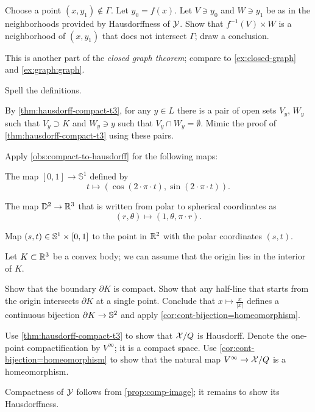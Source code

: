 Choose a point $(x,y_1)\notin \Gamma$.
Let $y_0=f(x)$.
Let $V\ni y_0$ and $W\ni y_1$ be as in the neighborhoods provided by Hausdorffness of $\mathcal{Y}$.
Show that $f^{-1}(V)\times W$ is a neighborhood of $(x,y_1)$ that does not intersect $\Gamma$; draw a conclusion.

 This is another part of the \emph{closed graph theorem}; compare to \ref{ex:closed-graph} and \ref{ex:graph:graph}.

 Spell the definitions.

By \ref{thm:hausdorff-compact-t3}, for any $y\in L$ there is a pair of open sets $V_y$, $W_y$ such that $V_y\supset K$ and $W_y\ni y$ such that $V_y\cap W_y=\emptyset$.
Mimic the proof of \ref{thm:hausdorff-compact-t3} using these pairs.

 Apply \ref{obs:compact-to-hausdorff} for the following maps:

The map $[0,1]\to \mathbb{S}^1$ defined by
\[t\mapsto (\cos (2\cdot\pi\cdot t), \sin(2\cdot\pi\cdot t)).\]

The map $\mathbb{D}^2\to \mathbb{R}^3$ that is written from polar to spherical coordinates as
\[(r,\theta)\mapsto (1, \theta, \pi\cdot r).\]

Map $(s,t)\in\mathbb{S}^1\times [0,1]$ to the point in $\mathbb{R}^2$ with the polar coordinates $(s,t)$.

Let $K\subset\mathbb{R}^3$ be a convex body; we can assume that the origin lies in the interior of $K$.

Show that the boundary $\partial K$ is compact.
Show that any half-line that starts from the origin intersects $\partial K$ at a single point.
Conclude that $x\mapsto \tfrac{x}{|x|}$ defines a continuous bijection $\partial K\to \mathbb{S}^2$ and apply \ref{cor:cont-bijection=homeomorphism}.

Use \ref{thm:hausdorff-compact-t3} to show that $\mathcal{X}/Q$ is Hausdorff.
Denote the one-point compactification by $V^\infty$; it is a compact space.
Use \ref{cor:cont-bijection=homeomorphism} to show that the natural map $V^\infty\to \mathcal{X}/Q$ is a homeomorphism.

Compactness of $\mathcal{Y}$ follows from \ref{prop:comp-image}; it remains to show its Hausdorffness.

